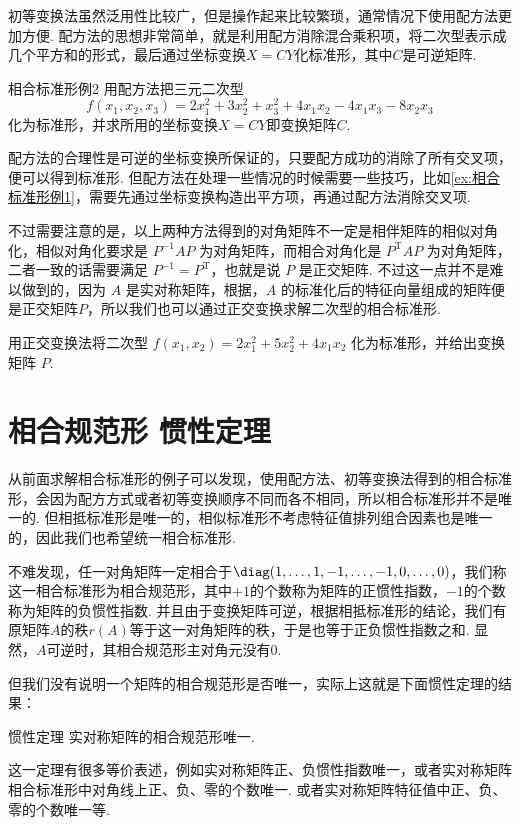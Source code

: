 初等变换法虽然泛用性比较广，但是操作起来比较繁琐，通常情况下使用配方法更加方便. 配方法的思想非常简单，就是利用配方消除混合乘积项，将二次型表示成几个平方和的形式，最后通过坐标变换$X=CY$化标准形，其中$C$是可逆矩阵.

\begin{example}{}{相合标准形例2}
    用配方法把三元二次型
    \[f(x_1,x_2,x_3)=2x_1^2+3x_2^2+x_3^2+4x_1x_2-4x_1x_3-8x_2x_3\]
    化为标准形，并求所用的坐标变换$X=CY$即变换矩阵$C$.
\end{example}

配方法的合理性是可逆的坐标变换所保证的，只要配方成功的消除了所有交叉项，便可以得到标准形. 但配方法在处理一些情况的时候需要一些技巧，比如\autoref{ex:相合标准形例1}，需要先通过坐标变换构造出平方项，再通过配方法消除交叉项.

不过需要注意的是，以上两种方法得到的对角矩阵不一定是相伴矩阵的相似对角化，相似对角化要求是 $P^{-1}AP$ 为对角矩阵，而相合对角化是 $P^\mathrm{T}AP$ 为对角矩阵，二者一致的话需要满足 $P^{-1} = P^\mathrm{T}$，也就是说 $P$ 是正交矩阵. 不过这一点并不是难以做到的，因为 $A$ 是实对称矩阵，根据，$A$ 的标准化后的特征向量组成的矩阵便是正交矩阵$P$，所以我们也可以通过正交变换求解二次型的相合标准形.

\begin{example}{}{}
    用正交变换法将二次型 $f(x_1,x_2) = 2x_1^2 + 5x_2^2 + 4x_1x_2$ 化为标准形，并给出变换矩阵 $P$.
\end{example}

\section{相合规范形 \quad 惯性定理}

从前面求解相合标准形的例子可以发现，使用配方法、初等变换法得到的相合标准形，会因为配方方式或者初等变换顺序不同而各不相同，所以相合标准形并不是唯一的. 但相抵标准形是唯一的，相似标准形不考虑特征值排列组合因素也是唯一的，因此我们也希望统一相合标准形.

不难发现，任一对角矩阵一定相合于$\diag(1,\ldots,1,-1,\ldots,-1,0,\ldots,0)$，我们称这一相合标准形为相合规范形，其中$+1$的个数称为矩阵的正惯性指数，$-1$的个数称为矩阵的负惯性指数. 并且由于变换矩阵可逆，根据相抵标准形的结论，我们有原矩阵$A$的秩$r(A)$等于这一对角矩阵的秩，于是也等于正负惯性指数之和. 显然，$A$可逆时，其相合规范形主对角元没有0.

但我们没有说明一个矩阵的相合规范形是否唯一，实际上这就是下面惯性定理的结果：
\begin{theorem}{惯性定理}{}
    实对称矩阵的相合规范形唯一.
\end{theorem}
这一定理有很多等价表述，例如实对称矩阵正、负惯性指数唯一，或者实对称矩阵相合标准形中对角线上正、负、零的个数唯一. 或者实对称矩阵特征值中正、负、零的个数唯一等.

